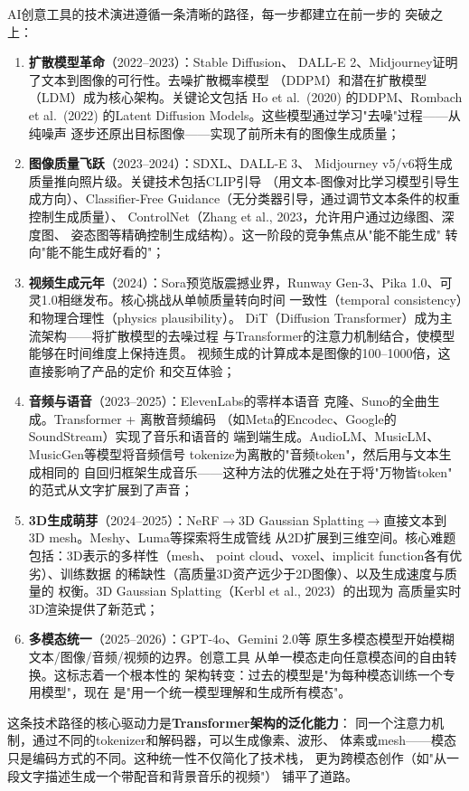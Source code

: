 \begin{corebox}
AI创意工具的技术演进遵循一条清晰的路径，每一步都建立在前一步的
突破之上：

\begin{enumerate}[leftmargin=2em]
  \item \textbf{扩散模型革命}（2022--2023）：Stable Diffusion、
    DALL-E 2、Midjourney证明了文本到图像的可行性。去噪扩散概率模型
    （DDPM）和潜在扩散模型（LDM）成为核心架构。关键论文包括
    Ho et al.\ (2020) 的DDPM、Rombach et al.\ (2022) 的Latent
    Diffusion Models。这些模型通过学习"去噪"过程——从纯噪声
    逐步还原出目标图像——实现了前所未有的图像生成质量；
  \item \textbf{图像质量飞跃}（2023--2024）：SDXL、DALL-E 3、
    Midjourney v5/v6将生成质量推向照片级。关键技术包括CLIP引导
    （用文本-图像对比学习模型引导生成方向）、Classifier-Free
    Guidance（无分类器引导，通过调节文本条件的权重控制生成质量）、
    ControlNet（Zhang et al., 2023，允许用户通过边缘图、深度图、
    姿态图等精确控制生成结构）。这一阶段的竞争焦点从"能不能生成"
    转向"能不能生成好看的"；
  \item \textbf{视频生成元年}（2024）：Sora预览版震撼业界，Runway
    Gen-3、Pika 1.0、可灵1.0相继发布。核心挑战从单帧质量转向时间
    一致性（temporal consistency）和物理合理性（physics plausibility）。
    DiT（Diffusion Transformer）成为主流架构——将扩散模型的去噪过程
    与Transformer的注意力机制结合，使模型能够在时间维度上保持连贯。
    视频生成的计算成本是图像的100--1000倍，这直接影响了产品的定价
    和交互体验；
  \item \textbf{音频与语音}（2023--2025）：ElevenLabs的零样本语音
    克隆、Suno的全曲生成。Transformer + 离散音频编码
    （如Meta的Encodec、Google的SoundStream）实现了音乐和语音的
    端到端生成。AudioLM、MusicLM、MusicGen等模型将音频信号
    tokenize为离散的"音频token"，然后用与文本生成相同的
    自回归框架生成音乐——这种方法的优雅之处在于将"万物皆token"
    的范式从文字扩展到了声音；
  \item \textbf{3D生成萌芽}（2024--2025）：NeRF$\to$3D Gaussian
    Splatting$\to$直接文本到3D mesh。Meshy、Luma等探索将生成管线
    从2D扩展到三维空间。核心难题包括：3D表示的多样性（mesh、
    point cloud、voxel、implicit function各有优劣）、训练数据
    的稀缺性（高质量3D资产远少于2D图像）、以及生成速度与质量的
    权衡。3D Gaussian Splatting（Kerbl et al., 2023）的出现为
    高质量实时3D渲染提供了新范式；
  \item \textbf{多模态统一}（2025--2026）：GPT-4o、Gemini 2.0等
    原生多模态模型开始模糊文本/图像/音频/视频的边界。创意工具
    从单一模态走向任意模态间的自由转换。这标志着一个根本性的
    架构转变：过去的模型是"为每种模态训练一个专用模型"，现在
    是"用一个统一模型理解和生成所有模态"。
\end{enumerate}

\medskip
\noindent 这条技术路径的核心驱动力是\textbf{Transformer架构的泛化能力}：
同一个注意力机制，通过不同的tokenizer和解码器，可以生成像素、波形、
体素或mesh——模态只是编码方式的不同。这种统一性不仅简化了技术栈，
更为跨模态创作（如"从一段文字描述生成一个带配音和背景音乐的视频"）
铺平了道路。
\end{corebox}


